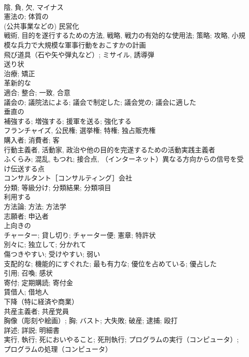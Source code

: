 \documentclass[8pt]{extreport}
\begin{document}
\begin{CJK}{UTF8}{min}
\\	陰, 負, 欠, マイナス	
\\	憲法の; 体質の	
\\	(公共事業などの) 民営化	
\\	戦術, 目的を遂行するための方法, 戦略, 戦力の有効的な使用法; 策略; 攻略, 小規模な兵力で大規模な軍事行動をおこすかの計画	
\\	飛び道具（石や矢や弾丸など）; ミサイル, 誘導弾	
\\	送り状	
\\	治療; 矯正	
\\	革新的な	
\\	適合; 整合; 一致, 合意	
\\	議会の; 議院法による; 議会で制定した; 議会党の; 議会に適した	
\\	垂直の	
\\	補強する; 増強する; 援軍を送る; 強化する	
\\	フランチャイズ, 公民権; 選挙権; 特権; 独占販売権	
\\	購入者; 消費者; 客	
\\	行動主義者, 活動家, 政治や他の目的を完遂するための活動実践主義者	
\\	ふくらみ; 混乱, もつれ; 接合点, （インターネット）異なる方向からの信号を受け伝送する点	
\\	コンサルタント［コンサルティング］会社	
\\	分類; 等級分け; 分類結果; 分類項目	
\\	利用する	
\\	方法論; 方法; 方法学	
\\	志願者; 申込者	
\\	上向きの	
\\	チャーター; 貸し切り; チャーター便; 憲章; 特許状	
\\	別々に; 独立して; 分かれて	
\\	傷つきやすい; 受けやすい; 弱い	
\\	支配的な; 機能的にすぐれた; 最も有力な; 優位を占めている; 優占した	
\\	引用; 召喚; 感状	
\\	寄付; 定期購読; 寄付金	
\\	賃借人; 借地人	
\\	下降（特に経済や商業）	
\\	共産主義者; 共産党員	
\\	胸像（彫刻や絵画）; 胸; バスト; 大失敗; 破産; 逮捕; 殴打	
\\	詳述; 詳説; 明細書	
\\	実行, 執行; 死においやること; 死刑執行; プログラムの実行（コンピュータ）; プログラムの処理（コンピュータ）	

\end{CJK}
\end{document}
